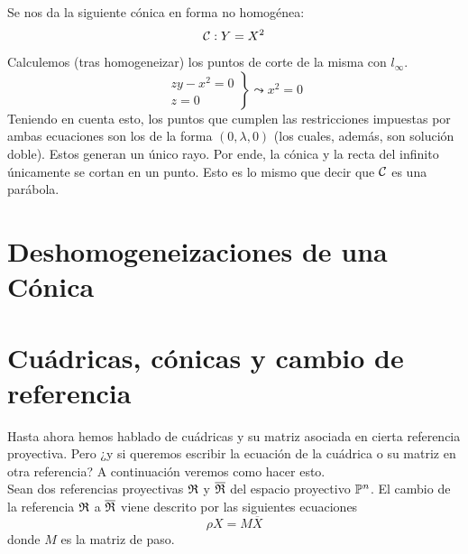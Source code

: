\begin{exa}[Parábola]
	Se nos da la siguiente cónica en forma no homogénea:
	\[\mathcal{C}:Y=X^2\]
	Calculemos (tras homogeneizar) los puntos de corte de la misma con $l_\infty$.
	\[\left.\begin{array}{c}
	zy-x^2=0\\
	z=0
	\end{array}\right\}\leadsto x^2=0\]
	Teniendo en cuenta esto, los puntos que cumplen las restricciones impuestas por ambas ecuaciones son los de la forma $(0,\lambda,0)$ (los cuales, además, son solución doble). Estos generan un único rayo. Por ende, la cónica y la recta del infinito únicamente se cortan en un punto. Esto es lo mismo que decir que $\mathcal{C}$ es una parábola.
\end{exa}
\section{Deshomogeneizaciones de una Cónica}

\section{Cuádricas, cónicas y cambio de referencia}
Hasta ahora hemos hablado de cuádricas y su matriz asociada en cierta referencia proyectiva. Pero ¿y si queremos escribir la ecuación de la cuádrica o su matriz en otra referencia? A continuación veremos como hacer esto.\\

Sean dos referencias proyectivas $\mathfrak{R}$ y $\overline{\mathfrak{R}}$ del espacio proyectivo $\mathbb{P}^n$. El cambio de la referencia $\mathfrak{R}$ a $\overline{\mathfrak{R}}$ viene descrito por las siguientes ecuaciones
\begin{equation}
\rho X=M\overline{X}
\end{equation}
donde $M$ es la matriz de paso. 

